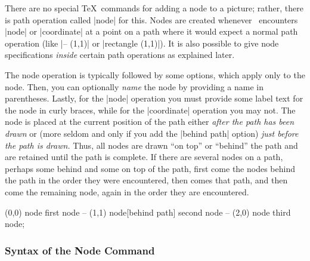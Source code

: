There are no special \TeX\ commands for adding a node to a picture; rather,
there is path operation called |node| for this. Nodes are created whenever
\tikzname\ encounters |node| or |coordinate| at a point on a path where it
would expect a normal path operation (like |-- (1,1)| or |rectangle (1,1)|). It
is also possible to give node specifications \emph{inside} certain path
operations as explained later.

The node operation is typically followed by some options, which apply only to
the node. Then, you can optionally \emph{name} the node by providing a name in
parentheses. Lastly, for the |node| operation you must provide some label text
for the node in curly braces, while for the |coordinate| operation you may not.
The node is placed at the current position of the path either \emph{after the
path has been drawn} or (more seldom and only if you add the |behind path|
option) \emph{just before the path is drawn.} Thus, all nodes are drawn ``on
top'' or ``behind'' the path and are retained until the path is complete. If
there are several nodes on a path, perhaps some behind and some on top of the
path, first come the nodes behind the path in the order they were encountered,
then comes that path, and then come the remaining node, again in the order they
are encountered.
%
\begin{codeexample}[]
\tikz \fill [fill=yellow!80!black]
     (0,0) node              {first node}
  -- (1,1) node[behind path] {second node}
  -- (2,0) node              {third node};
\end{codeexample}


\subsubsection{Syntax of the Node Command}

